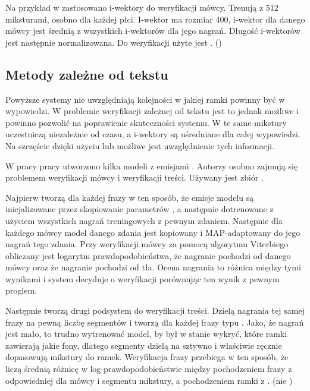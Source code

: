 Na przykład w \cite{utteranceVerificationFor}
zastosowano i-wektory do weryfikacji mówcy. Trenują  z 512 miksturami, osobno dla każdej płci.
I-wektor ma rozmiar 400, i-wektor dla danego mówcy jest średnią z wszystkich i-wektorów dla jego nagrań.
Długość i-wektorów jest następnie normalizowana. Do weryfikacji użyte jest
. ()


\subsection{Metody zależne od tekstu}

Powyższe systemy nie uwzględniają kolejności w jakiej ramki powinny być w wypowiedzi. W problemie weryfikacji
zależnej od tekstu jest to jednak możliwe i powinno pozwolić na poprawienie skuteczności systemu.
W  te same mikstury uczestniczą niezależnie od czasu, a i-wektory są uśredniane dla całej
wypowiedzi. Na szczęście dzięki użyciu  lub  możliwe jest uwzględnienie tych informacji\cite{parallelSpeakerAnd}.

W pracy \cite{parallelSpeakerAnd}
pracy utworzono kilka modeli  z emisjami . Autorzy osobno
zajmują się problemem weryfikacji mówcy i weryfikacji treści. Używany jest zbiór .

Najpierw tworzą  dla każdej frazy w ten sposób, że emisje modelu są inicjalizowane przez
skopiowanie parametrów ,
a następnie dotrenowane z użyciem wszystkich nagrań treningowych z pewnym zdaniem.
Następnie dla każdego mówcy model danego zdania jest kopiowany i MAP-adaptowany do jego nagrań tego zdania.
Przy weryfikacji mówcy za pomocą algorytmu Viterbiego obliczany jest logarytm
prawdopodobieństwa, że nagranie pochodzi od danego mówcy oraz że nagranie pochodzi od  tła.
Ocena nagrania to różnica między tymi wynikami i system decyduje o weryfikacji porównując ten wynik z pewnym progiem.

Następnie tworzą drugi podsystem do weryfikacji treści. Dzielą nagrania tej samej frazy na pewną liczbę segmentów
i tworzą dla każdej frazy  typu . Jako, że nagrań jest mało, to trudno
wytrenować model, by był w stanie wykryć, które ramki zawierają jakie fony, dlatego segmenty dzielą na sztywno
i właściwie ręcznie dopasowują mikstury do ramek. Weryfikacja frazy przebiega w ten sposób, że liczą średnią
różnicę w log-prawdopodobieństwie między pochodzeniem frazy z odpowiedniej dla mówcy i segmentu mikstury, a
pochodzeniem ramki z . (nie )

